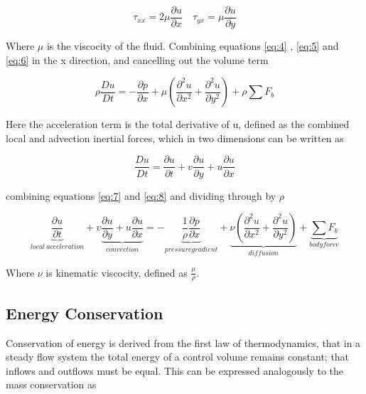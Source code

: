     \begin{equation} \label{eq:6}
      \tau_{xx} = 2 \mu \frac{\partial u}{\partial x} \quad \tau_{yx} = \mu \frac{\partial u}{\partial y}
    \end{equation}

    Where $\mu$ is the viscocity of the fluid. Combining equations \ref{eq:4} , \ref{eq:5} and \ref{eq:6} in the x direction, and cancelling out the volume term

    \begin{equation} \label{eq:7}
      \rho \frac{Du}{Dt} = - \frac{\partial p}{\partial x} + \mu (\frac{\partial^2 u}{\partial x^2} + \frac{\partial^2 u}{\partial y^2}) + \rho \sum F_{b}
    \end{equation}
    
    Here the acceleration term is the total derivative of u, defined as the combined local and advection inertial forces, which in two dimensions can be written as

    \begin{equation} \label{eq:8}
      \frac{Du}{Dt} = \frac{\partial u}{\partial t} + v \frac{\partial u}{\partial y} + u \frac{\partial u}{\partial x}
    \end{equation}

    combining equations \ref{eq:7} and \ref{eq:8} and dividing through by $\rho$

    \begin{equation} \label{eq:9}
      \underbrace{\frac{\partial u}{\partial t}}_{local\ acceleration} + v \underbrace{\frac{\partial u}{\partial y} + u \frac{\partial u}{\partial x}}_{convection} = - \underbrace{\frac{1}{\rho} \frac{\partial p}{\partial x}}_{pressure gradient} + \underbrace{\nu (\frac{\partial^2 u}{\partial x^2} + \frac{\partial^2 u}{\partial y^2})}_{diffusion} + \underbrace{\sum F_{b}}_{body force}
    \end{equation}

    Where $\nu$ is kinematic viscocity, defined as $\frac{\mu}{\rho}$. 

    \subsection{Energy Conservation}

    Conservation of energy is derived from the first law of thermodynamics, that in a steady flow system the total energy of a control volume remains constant; that inflows and outflows must be equal. This can be expressed analogously to the mass conservation as 

